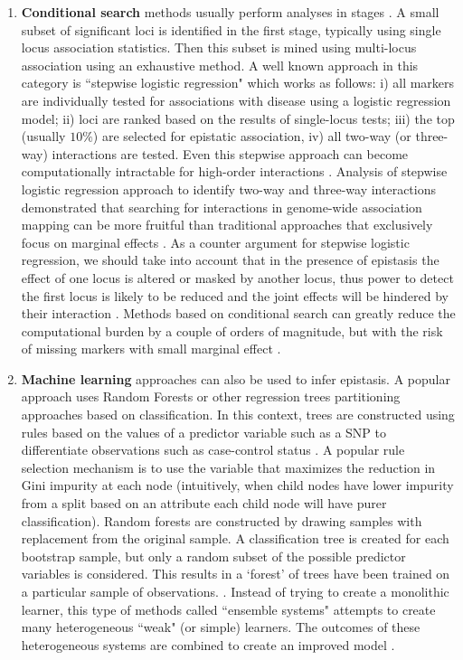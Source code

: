 \begin{enumerate}
	\item \textbf{Conditional search} methods usually perform analyses in stages \cite{li2011detecting}.
A small subset of significant loci is identified in the first stage, typically using single locus association statistics.
Then this subset is mined using multi-locus association using an exhaustive method. 
A well known approach in this category is ``stepwise logistic regression" which works as follows:
i) all markers are individually tested for associations with disease using a logistic regression model;
ii) loci are ranked based on the results of single-locus tests;
iii) the top (usually $10\%$) are selected for epistatic association, 
iv) all two-way (or three-way) interactions are tested. 
Even this stepwise approach can become computationally intractable for high-order interactions \cite{zhang2007bayesian}.
Analysis of stepwise logistic regression approach to identify two-way and three-way interactions demonstrated that searching for interactions in genome-wide association mapping can be more fruitful than traditional approaches that exclusively focus on marginal effects \cite{zhang2007bayesian}.
As a counter argument for stepwise logistic regression, we should take into account that in the presence of epistasis the effect of one locus is altered or masked by another locus, thus power to detect the first locus is likely to be reduced and the joint effects will be hindered by their interaction \cite{cordell2002epistasis}. 
Methods based on conditional search can greatly reduce the computational burden by a couple of orders of magnitude, but with the risk of missing markers with small marginal effect \cite{li2011detecting}.

	\item \textbf{Machine learning} approaches can also be used to infer epistasis.
A popular approach uses Random Forests \cite{li2011detecting} or other regression trees partitioning approaches based on classification.
In this context, trees are constructed using rules based on the values of a predictor variable such as a SNP to differentiate observations such as case-control status \cite{cordell2009detecting}.
A popular rule selection mechanism is to use the variable that maximizes the reduction in Gini impurity \cite{REF} at each node (intuitively, when child nodes have lower impurity from a split based on an attribute each child node will have purer classification).
Random forests are constructed by drawing samples with replacement from the original sample. 
A classification tree is created for each bootstrap sample, but only a random subset of the possible predictor variables is considered. 
This results in a `forest' of trees have been trained on a particular sample of observations. \cite{cordell2009detecting}.
Instead of trying to create a monolithic learner, this type of methods called ``ensemble systems" attempts to create many heterogeneous ``weak" (or simple) learners. 
The outcomes of these heterogeneous systems are combined to create an improved model \cite{li2011detecting}.


\end{enumerate}
